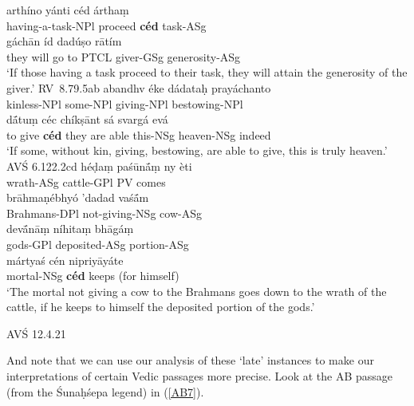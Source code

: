 \documentclass[output=paper,
modfonts
]{LSP/langsci}
\begin{document}
\begin{exe}
\ex
	\begin{xlist}
	\ex\gll {\ob}arthíno{\cb} yánti céd árthaṃ \\
			{\db}having-a-task-NPl proceed \textbf{céd} task-ASg \\
			
		\gll gáchān íd dadúṣo rātím \\
			{they will go to} PTCL giver-GSg generosity-ASg \\
		\glt `If those having a task proceed to their task, they will attain the generosity of the giver.' \hfill \mbox{RV 8.79.5ab}
	\ex\gll {\ob}abandhv éke dádataḥ prayáchanto{\cb} \\
			{\db}kinless-NPl some-NPl giving-NPl bestowing-NPl \\
			
		\gll dā́tuṃ céc chíkṣānt sá svargá evá \\
			{to give} \textbf{céd} {they are able} this-NSg heaven-NSg indeed \\
		\glt `If some, without kin, giving, bestowing, are able to give, this is truly heaven.' \hfill {AVŚ 6.122.2cd}
	\ex\gll héḍaṃ paśūnā́ṃ ny èti \\
			wrath-ASg cattle-GPl PV comes \\
			
		\gll brāhmaṇébhyó 'dadad vaśā́m \\
			Brahmans-DPl not-giving-NSg cow-ASg \\
			
		\gll {\ob}devā́nāṃ níhitaṃ bhāgáṃ{\cb} \\
			{\db}gods-GPl deposited-ASg portion-ASg \\
			
		\gll mártyaś cén nipriyāyáte \\
			mortal-NSg \textbf{céd} {keeps (for himself)} \\
		\glt `The mortal not giving a cow to the Brahmans goes down to the wrath of the cattle, if he keeps to himself the deposited portion of the gods.'
		
		\hfill {AVŚ 12.4.21}
	\end{xlist}
\end{exe}

\noindent And note that we can use our analysis of these `late' instances to make our interpretations of certain
Vedic passages more precise. Look at the AB passage (from the Śunaḥśepa legend) in (\ref{AB7}).

\end{document}
